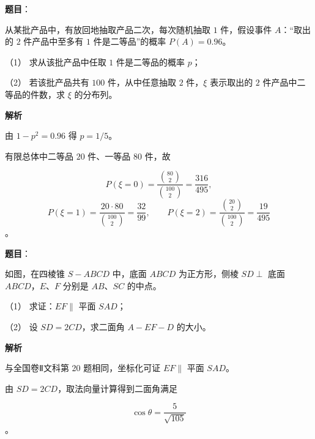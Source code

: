 \begin{answer}

\textbf{题目}：

从某批产品中，有放回地抽取产品二次，每次随机抽取 $1$ 件，假设事件 $A$：“取出的 $2$ 件产品中至多有 $1$ 件是二等品”的概率 $P(A)=0.96$。

（1） 求从该批产品中任取 $1$ 件是二等品的概率 $p$；

（2） 若该批产品共有 $100$ 件，从中任意抽取 $2$ 件，$\xi$ 表示取出的 $2$ 件产品中二等品的件数，求 $\xi$ 的分布列。

\textbf{解析}


由 $1-p^2=0.96$ 得 $p=1/5$。


有限总体中二等品 $20$ 件、一等品 $80$ 件，故

\nopagebreak[4]
\[
P(\xi=0)=\frac{\binom{80}{2}}{\binom{100}{2}}=\frac{316}{495},
\]
\nopagebreak[4]
\[
P(\xi=1)=\frac{20\cdot80}{\binom{100}{2}}=\frac{32}{99},
\qquad
P(\xi=2)=\frac{\binom{20}{2}}{\binom{100}{2}}=\frac{19}{495}
\]
。



\end{answer}
\begin{answer}

\textbf{题目}：

如图，在四棱锥 $S-ABCD$ 中，底面 $ABCD$ 为正方形，侧棱 $SD\perp$ 底面 $ABCD$，$E\text{、}F$ 分别是 $AB\text{、}SC$ 的中点。
\nopagebreak[4]
\begin{center}\end{center}
\nopagebreak[4]
（1） 求证：$EF\parallel$ 平面 $SAD$；

（2） 设 $SD=2CD$，求二面角 $A-EF-D$ 的大小。

\textbf{解析}


与全国卷Ⅱ文科第 20 题相同，坐标化可证 $EF\parallel$ 平面 $SAD$。


由 $SD=2CD$，取法向量计算得到二面角满足

\nopagebreak[4]
\[
\cos\theta=\frac5{\sqrt{105}}
\]
。



\end{answer}
